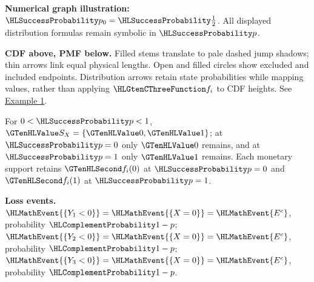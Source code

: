 {\begin{center}
\end{center}
\textbf{Numerical graph illustration:} $\SuccessProb{p_0}=\SuccessProb{\frac{1}{2}}$. All displayed distribution formulas remain symbolic in $\SuccessProb{p}$.
\par\textbf{CDF above, PMF below.} Filled stems translate to pale dashed jump shadows; thin arrows link equal physical lengths. Open and filled circles show excluded and included endpoints. Distribution arrows retain state probabilities while mapping values, rather than applying $\TransformationFunction{f_i}$ to CDF heights. See \hyperref[ex:intro-one]{Example 1}.\par
For $0<\SuccessProb{p}<1$, $\Indicator{S_X}=\{\Indicator{0},\Indicator{1}\}$; at $\SuccessProb{p}=0$ only $\Indicator{0}$ remains, and at $\SuccessProb{p}=1$ only $\Indicator{1}$ remains. Each monetary support retains $\Money{f_i(0)}$ at $\SuccessProb{p}=0$ and $\Money{f_i(1)}$ at $\SuccessProb{p}=1$.
\par\textbf{Loss events.} $\HLMathEvent{\{Y_1<0\}}=\HLMathEvent{\{X=0\}}=\HLMathEvent{E^c}$, probability $\FailureProb{1-p}$; $\HLMathEvent{\{Y_2<0\}}=\HLMathEvent{\{X=0\}}=\HLMathEvent{E^c}$, probability $\FailureProb{1-p}$; $\HLMathEvent{\{Y_3<0\}}=\HLMathEvent{\{X=0\}}=\HLMathEvent{E^c}$, probability $\FailureProb{1-p}$.
\endgroup
}

